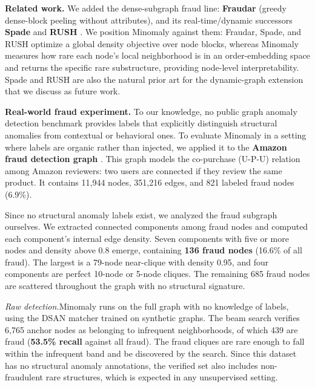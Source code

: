 \documentclass[11pt]{article}
\begin{document}
\medskip
\textbf{Related work.} We added the dense-subgraph fraud line: \textbf{Fraudar} \citep{hooi2016fraudar} (greedy dense-block peeling without attributes), and its real-time/dynamic successors \textbf{Spade} \citep{jiang2023spade} and \textbf{RUSH} \citep{chen2024rush}. We position Minomaly against them: Fraudar, Spade, and RUSH optimize a global density objective over node blocks, whereas Minomaly measures how rare each node's local neighborhood is in an order-embedding space and returns the specific rare substructure, providing node-level interpretability. Spade and RUSH are also the natural prior art for the dynamic-graph extension that we discuss as future work.

\medskip
\textbf{Real-world fraud experiment.} To our knowledge, no public graph anomaly detection benchmark provides labels that explicitly distinguish structural anomalies from contextual or behavioral ones. To evaluate Minomaly in a setting where labels are organic rather than injected, we applied it to the \textbf{Amazon fraud detection graph} \citep{dou2020enhancing}. This graph models the co-purchase (U-P-U) relation among Amazon reviewers: two users are connected if they review the same product. It contains 11{,}944 nodes, 351{,}216 edges, and 821 labeled fraud nodes (6.9\%).

Since no structural anomaly labels exist, we analyzed the fraud subgraph ourselves. We extracted connected components among fraud nodes and computed each component's internal edge density. Seven components with five or more nodes and density above 0.8 emerge, containing \textbf{136 fraud nodes} (16.6\% of all fraud). The largest is a 79-node near-clique with density 0.95, and four components are perfect 10-node or 5-node cliques. The remaining 685 fraud nodes are scattered throughout the graph with no structural signature.

\medskip
\noindent\textit{Raw detection.}\quad Minomaly runs on the full graph with no knowledge of labels, using the DSAN matcher trained on synthetic graphs. The beam search verifies 6{,}765 anchor nodes as belonging to infrequent neighborhoods, of which 439 are fraud (\textbf{53.5\% recall} against all fraud). The fraud cliques are rare enough to fall within the infrequent band and be discovered by the search. Since this dataset has no structural anomaly annotations, the verified set also includes non-fraudulent rare structures, which is expected in any unsupervised setting.
\end{document}
